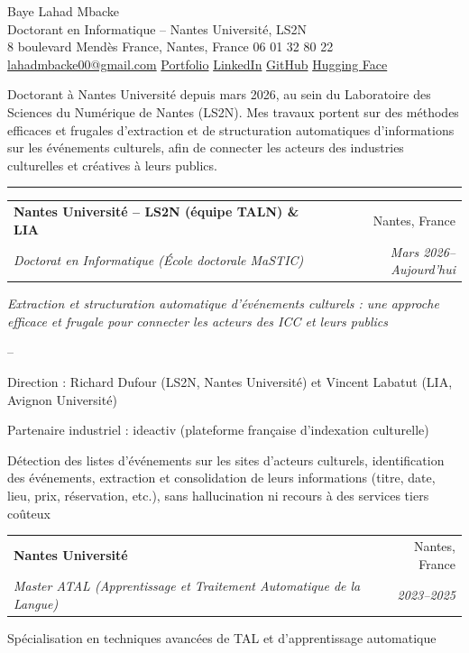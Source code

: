\documentclass[11pt,a4paper]{article}
\makeatletter
\newcommand{\cvsection}[1]{%
  \vspace{10pt}{\Large\color{accent}#1}\par\vspace{-6pt}%
  {\color{accent}\rule{\linewidth}{0.8pt}}\par\vspace{4pt}}
\newcommand{\cventry}[4]{%
  \begin{tabularx}{\linewidth}{@{}X r@{}}
    \textbf{#1} & #2 \\
    \textit{#3} & \textit{#4}
  \end{tabularx}\par}
\newenvironment{cvitems}{%
  \begin{list}{--}{\setlength{\leftmargin}{1.5em}\setlength{\itemsep}{1pt}
  \setlength{\parsep}{0pt}\setlength{\topsep}{2pt}}}{\end{list}\vspace{4pt}}
\makeatother
\begin{document}
\begin{center}
  {\fontsize{24}{28}\selectfont\color{accent} Baye Lahad Mbacke}\\[6pt]
  Doctorant en Informatique -- Nantes Université, LS2N\\[2pt]
  8 boulevard Mendès France, Nantes, France \textbullet{} 06 01 32 80 22\\[2pt]
  \href{mailto:lahadmbacke00@gmail.com}{lahadmbacke00@gmail.com} \textbullet{}
  \href{https://lahadmbacke.github.io/Lahad_Mbacke/fr.html}{Portfolio} \textbullet{}
  \href{https://linkedin.com/in/baye-lahad-mbacke}{LinkedIn} \textbullet{}
  \href{https://github.com/LahadMbacke}{GitHub} \textbullet{}
  \href{https://huggingface.co/Lahad}{Hugging Face}
\end{center}

\vspace{4pt}
Doctorant à Nantes Université depuis mars 2026, au sein du Laboratoire des Sciences du Numérique
de Nantes (LS2N). Mes travaux portent sur des méthodes efficaces et frugales d'extraction et de
structuration automatiques d'informations sur les événements culturels, afin de connecter les
acteurs des industries culturelles et créatives à leurs publics.

\cvsection{Formation Académique}

\cventry{Nantes Université -- LS2N (équipe TALN) \& LIA}{Nantes, France}
        {Doctorat en Informatique (École doctorale MaSTIC)}{Mars 2026--Aujourd'hui}
\textit{Extraction et structuration automatique d'événements culturels : une approche efficace et
frugale pour connecter les acteurs des ICC et leurs publics}
\begin{cvitems}
  \item Direction : Richard Dufour (LS2N, Nantes Université) et Vincent Labatut (LIA, Avignon Université)
  \item Partenaire industriel : ideactiv (plateforme française d'indexation culturelle)
  \item Détection des listes d'événements sur les sites d'acteurs culturels, identification des
        événements, extraction et consolidation de leurs informations (titre, date, lieu, prix,
        réservation, etc.), sans hallucination ni recours à des services tiers coûteux
\end{cvitems}

\cventry{Nantes Université}{Nantes, France}
        {Master ATAL (Apprentissage et Traitement Automatique de la Langue)}{2023--2025}
Spécialisation en techniques avancées de TAL et d'apprentissage automatique\par\vspace{6pt}
\end{document}
